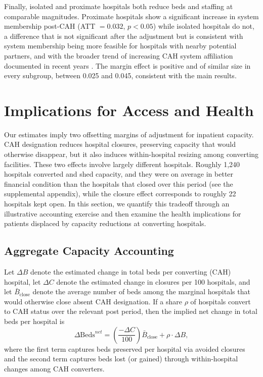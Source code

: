 \documentclass[a4paper, 12pt, twoside]{article}
\begin{document}
Finally, isolated and proximate hospitals both reduce beds and staffing at comparable magnitudes. Proximate hospitals show a significant increase in system membership post-CAH (ATT $= 0.032$, $p < 0.05$) while isolated hospitals do not, a difference that is not significant after the adjustment but is consistent with system membership being more feasible for hospitals with nearby potential partners, and with the broader trend of increasing CAH system affiliation documented in recent years \citep{whaley2024-jama}. The margin effect is positive and of similar size in every subgroup, between 0.025 and 0.045, consistent with the main results.



\section{Implications for Access and Health}
\label{sec:access_health}

Our estimates imply two offsetting margins of adjustment for inpatient capacity. CAH designation reduces hospital closures, preserving capacity that would otherwise disappear, but it also induces within-hospital resizing among converting facilities. These two effects involve largely different hospitals. Roughly 1,240 hospitals converted and shed capacity, and they were on average in better financial condition than the hospitals that closed over this period (see the supplemental appendix), while the closure effect corresponds to roughly 22 hospitals kept open. In this section, we quantify this tradeoff through an illustrative accounting exercise and then examine the health implications for patients displaced by capacity reductions at converting hospitals.

\subsection{Aggregate Capacity Accounting}
\label{sec:net_capacity}

Let $\Delta B$ denote the estimated change in total beds per converting (CAH) hospital, let $\Delta C$ denote the estimated change in closures per 100 hospitals, and let $\bar B_{\text{close}}$ denote the average number of beds among the marginal hospitals that would otherwise close absent CAH designation. If a share $\rho$ of hospitals convert to CAH status over the relevant post period, then the implied net change in total beds per hospital is
\begin{equation}
\Delta \text{Beds}^{net} =
\left(\frac{-\Delta C}{100}\right)\bar B_{\text{close}} +
\rho \cdot \Delta B,
\label{eq:net_beds}
\end{equation}
where the first term captures beds preserved per hospital via avoided closures and the second term captures beds lost (or gained) through within-hospital changes among CAH converters.
\end{document}
